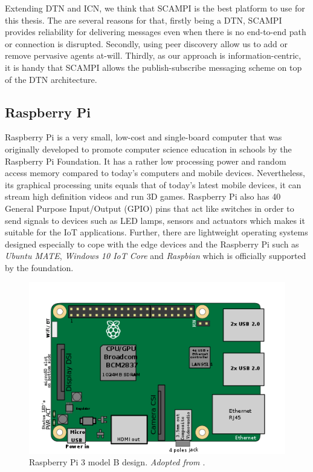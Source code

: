\noindent Extending DTN and ICN, we think that SCAMPI is the best platform to use for this thesis. The are several reasons for that, firstly being a DTN, SCAMPI provides reliability for delivering messages even when there is no end-to-end path or connection is disrupted. Secondly, using peer discovery allow us to add or remove pervasive agents at-will. Thirdly, as our approach is information-centric, it is handy that SCAMPI allows the publish-subscribe messaging scheme on top of the DTN architecture. 


\subsection{Raspberry Pi}
Raspberry Pi  \cite{RaspberryPi} is a very small, low-cost and single-board computer that was originally developed to promote computer science education in schools by the Raspberry Pi Foundation. It has a rather low processing power and random access memory compared to today's computers and mobile devices. Nevertheless, its graphical processing units equals that of today's latest mobile devices, it can stream high definition videos and run 3D games. Raspberry Pi also has 40 General Purpose Input/Output (GPIO) pins that act like switches in order to send signals to devices such as LED lamps, sensors and actuators which makes it suitable for the IoT applications. Further, there are lightweight operating systems designed especially to cope with the edge devices and the Raspberry Pi  such as \textit{Ubuntu MATE},  \textit{Windows 10 IoT Core} and \textit{Raspbian} which is officially supported by the foundation.
\begin{figure}[H]
	\centering
	\includegraphics[scale=0.5]{images/rpi.png}
	\caption{Raspberry Pi  3 model B design. \textit{Adopted from \cite{RASPI}}.}
	\label{fig:rpi}
\end{figure}
